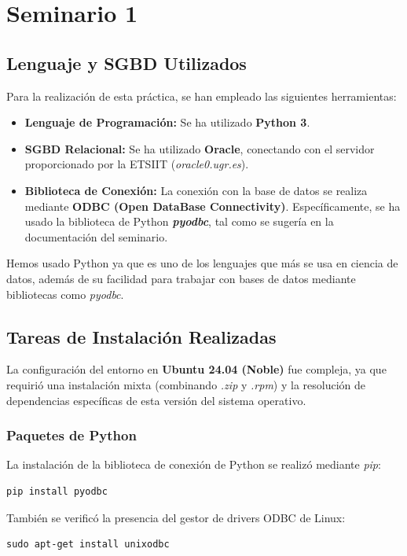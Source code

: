 \chapter{Seminario 1}

\section{Lenguaje y SGBD Utilizados}

Para la realización de esta práctica, se han empleado las siguientes herramientas:

\begin{itemize}
    \item \textbf{Lenguaje de Programación:} Se ha utilizado \textbf{Python 3}.
    \item \textbf{SGBD Relacional:} Se ha utilizado \textbf{Oracle}, conectando con el servidor proporcionado por la ETSIIT (\textit{oracle0.ugr.es}).
    \item \textbf{Biblioteca de Conexión:} La conexión con la base de datos se realiza mediante \textbf{ODBC (Open DataBase Connectivity)}. Específicamente, se ha usado la biblioteca de Python \textbf{\textit{pyodbc}}, tal como se sugería en la documentación del seminario.
\end{itemize}

Hemos usado Python ya que es uno de los lenguajes que más se usa en ciencia de datos, además de su facilidad para trabajar con bases de datos mediante bibliotecas como \textit{pyodbc}. 

\section{Tareas de Instalación Realizadas}

La configuración del entorno en \textbf{Ubuntu 24.04 (Noble)} fue compleja, ya que requirió una instalación mixta (combinando \textit{.zip} y \textit{.rpm}) y la resolución de dependencias específicas de esta versión del sistema operativo.

\subsection{Paquetes de Python}
La instalación de la biblioteca de conexión de Python se realizó mediante \textit{pip}:
\begin{lstlisting}
pip install pyodbc
\end{lstlisting}
También se verificó la presencia del gestor de drivers ODBC de Linux:
\begin{lstlisting}
sudo apt-get install unixodbc
\end{lstlisting}

